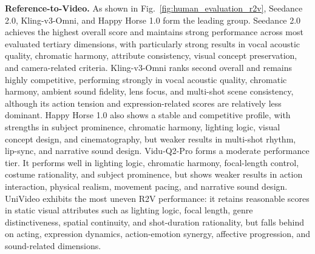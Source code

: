 \documentclass{llmxive}
\begin{document}
\noindent
\textbf{Reference-to-Video.} As shown in Fig.~\ref{fig:human_evaluation_r2v}, Seedance 2.0, Kling-v3-Omni, and Happy Horse 1.0 form the leading group. Seedance 2.0 achieves the highest overall score and maintains strong performance across most evaluated tertiary dimensions, with particularly strong results in vocal acoustic quality, chromatic harmony, attribute consistency, visual concept preservation, and camera-related criteria. Kling-v3-Omni ranks second overall and remains highly competitive, performing strongly in vocal acoustic quality, chromatic harmony, ambient sound fidelity, lens focus, and multi-shot scene consistency, although its action tension and expression-related scores are relatively less dominant. Happy Horse 1.0 also shows a stable and competitive profile, with strengths in subject prominence, chromatic harmony, lighting logic, visual concept design, and cinematography, but weaker results in multi-shot rhythm, lip-sync, and narrative sound design. Vidu-Q2-Pro forms a moderate performance tier. It performs well in lighting logic, chromatic harmony, focal-length control, costume rationality, and subject prominence, but shows weaker results in action interaction, physical realism, movement pacing, and narrative sound design. UniVideo exhibits the most uneven R2V performance: it retains reasonable scores in static visual attributes such as lighting logic, focal length, genre distinctiveness, spatial continuity, and shot-duration rationality, but falls behind on acting, expression dynamics, action-emotion synergy, affective progression, and sound-related dimensions. 





\end{document}
